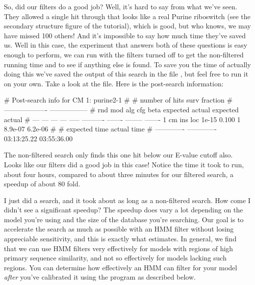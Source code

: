 So, did our filters do a good job? Well, it's hard to say from what
we've seen. They allowed a single hit through that looks like a real
Purine riboswitch (see the secondary structure figure of the
tutorial), which is good, but
who knows, we may have missed 100 others! And it's impossible to say
how much time they've saved us. Well in this case, the experiment that
answers both of these questions is easy enough to perform, we can run
 with the filters turned off to get the non-filtered
running time and to see if anything else is found. To save you the
time of actually doing this we've saved the output of this search in
the file , but feel free to run it
on your own. Take a look at the file. Here is the post-search
information:


\begin{sreoutput}
# Post-search info for CM 1: purine2-1
#
#                              number of hits       surv fraction  
#                            -------------------  -----------------
# rnd  mod  alg  cfg   beta    expected   actual  expected   actual
# ---  ---  ---  ---  -----  ----------  -------  --------  -------
    1   cm  ins  loc  1e-15       0.100        1   8.9e-07  6.2e-06
#
# expected time    actual time
# -------------  -------------
    03:13:25.22    03:55:36.00
\end{sreoutput}

The non-filtered search only finds this one hit below our E-value
cutoff also. Looks like our filters did a good job in this case!
Notice the time it took to run, about four hours, compared to about three
minutes for our filtered search, a speedup of about 80 fold. 

\begin{srefaq}{I just did a search, and it took about as long as a
    non-filtered search. How come I didn't see a significant speedup?}
  The speedup does vary a lot depending on the model you're using and
  the size of the database you're searching. Our goal is to accelerate
  the search as much as possible with an HMM filter without losing
  appreciable sensitivity, and this is exactly what 
  estimates. In general, we find that we can use HMM filters very
  effectively for models with regions of high primary sequence
  similarity, and not so effectively for models lacking such
  regions. You can determine how effectively an HMM can filter for
  your model \emph{after} you've calibrated it using the 
  program as described below.
\end{srefaq}


